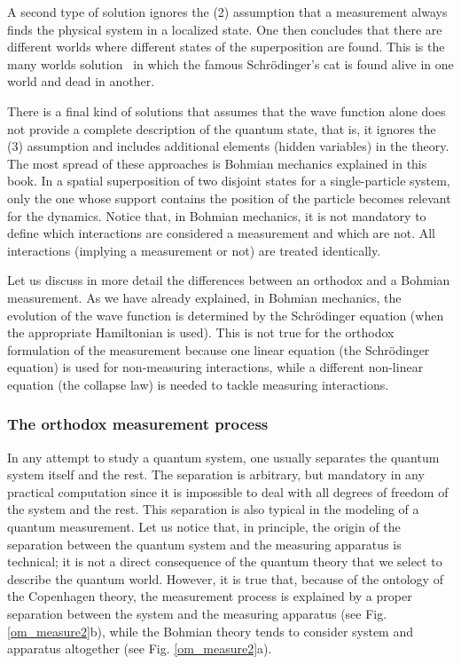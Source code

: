 \documentclass[nofootinbib, secnumarabic, amsmath, nobibnotes,10pt,aps,pra]{revtex4-1}
\newcommand{\fref}[1]{Fig. \ref{#1}}
\begin{document}
A second type of solution ignores the (2) assumption that a measurement always finds the physical system in a localized state.
One then concludes that there are different worlds where different states of the superposition are found.
This is the many worlds solution~\cite{om.Everett57,om.wallace12} in which the famous Schr\"odinger's cat
is found alive in one world and dead in another.

There is a final kind of solutions that assumes that the wave function alone does not provide a complete description of the quantum state, that is, it ignores the (3) assumption and includes additional elements (hidden variables) in the theory. The most spread of these approaches is Bohmian mechanics explained in this book.  In a spatial superposition of two disjoint states for a single-particle system, only the one whose support contains the position of the particle becomes  relevant for the dynamics. Notice that, in Bohmian mechanics, it is not mandatory to define which interactions are considered a measurement and which are not. All interactions (implying a measurement or not) are treated identically. 

Let us discuss in more detail the differences between an orthodox and a Bohmian measurement. As we have already explained, in Bohmian mechanics, the evolution of the wave function is determined by the Schr\"odinger equation (when the appropriate Hamiltonian is used). This is not true for the orthodox formulation of the measurement because one linear equation (the Schr\"odinger equation) is used for non-measuring interactions, while a different non-linear equation (the collapse law) is needed to tackle measuring interactions. 

\subsubsection{The orthodox measurement process}\label{meaort}

In any attempt to study a quantum system, one usually separates the quantum system itself and the rest. The separation is arbitrary, but mandatory in any practical computation since it is impossible to deal with all degrees of freedom of the system and the rest. This separation is also typical in the modeling of a quantum measurement. Let us notice that, in principle, the origin of the separation between the quantum system and the measuring apparatus is technical; it is not a direct consequence of the quantum theory that we select to describe the quantum world. However, it is true that, because of the ontology of the Copenhagen theory, the measurement process is explained by a proper separation between the system and the measuring apparatus (see \fref{om_measure2}b), while the Bohmian theory tends to consider system and apparatus altogether (see \fref{om_measure2}a). 
\end{document}
